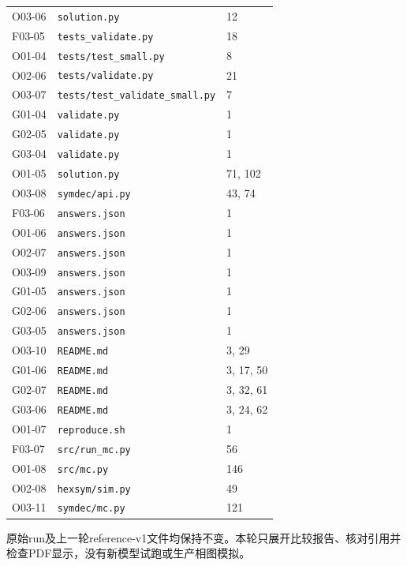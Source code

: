 \documentclass[11pt,a4paper]{article}
\begin{document}
{\begin{longtable}
{}\label{src:O03-06}O03-06 & \nolinkurl{solution.py} & 12\tabularnewline
{}\label{src:F03-05}F03-05 & \nolinkurl{tests_validate.py} & 18\tabularnewline
{}\label{src:O01-04}O01-04 & \nolinkurl{tests/test_small.py} & 8\tabularnewline
{}\label{src:O02-06}O02-06 & \nolinkurl{tests/validate.py} & 21\tabularnewline
{}\label{src:O03-07}O03-07 & \nolinkurl{tests/test_validate_small.py} & 7\tabularnewline
{}\label{src:G01-04}G01-04 & \nolinkurl{validate.py} & 1\tabularnewline
{}\label{src:G02-05}G02-05 & \nolinkurl{validate.py} & 1\tabularnewline
{}\label{src:G03-04}G03-04 & \nolinkurl{validate.py} & 1\tabularnewline
{}\label{src:O01-05}O01-05 & \nolinkurl{solution.py} & 71, 102\tabularnewline
{}\label{src:O03-08}O03-08 & \nolinkurl{symdec/api.py} & 43, 74\tabularnewline
{}\label{src:F03-06}F03-06 & \nolinkurl{answers.json} & 1\tabularnewline
{}\label{src:O01-06}O01-06 & \nolinkurl{answers.json} & 1\tabularnewline
{}\label{src:O02-07}O02-07 & \nolinkurl{answers.json} & 1\tabularnewline
{}\label{src:O03-09}O03-09 & \nolinkurl{answers.json} & 1\tabularnewline
{}\label{src:G01-05}G01-05 & \nolinkurl{answers.json} & 1\tabularnewline
{}\label{src:G02-06}G02-06 & \nolinkurl{answers.json} & 1\tabularnewline
{}\label{src:G03-05}G03-05 & \nolinkurl{answers.json} & 1\tabularnewline
{}\label{src:O03-10}O03-10 & \nolinkurl{README.md} & 3, 29\tabularnewline
{}\label{src:G01-06}G01-06 & \nolinkurl{README.md} & 3, 17, 50\tabularnewline
{}\label{src:G02-07}G02-07 & \nolinkurl{README.md} & 3, 32, 61\tabularnewline
{}\label{src:G03-06}G03-06 & \nolinkurl{README.md} & 3, 24, 62\tabularnewline
{}\label{src:O01-07}O01-07 & \nolinkurl{reproduce.sh} & 1\tabularnewline
{}\label{src:F03-07}F03-07 & \nolinkurl{src/run_mc.py} & 56\tabularnewline
{}\label{src:O01-08}O01-08 & \nolinkurl{src/mc.py} & 146\tabularnewline
{}\label{src:O02-08}O02-08 & \nolinkurl{hexsym/sim.py} & 49\tabularnewline
{}\label{src:O03-11}O03-11 & \nolinkurl{symdec/mc.py} & 121\tabularnewline
\bottomrule
\end{longtable}
}
原始run及上一轮reference-v1文件均保持不变。本轮只展开比较报告、核对引用并检查PDF显示，没有新模型试跑或生产相图模拟。
\end{document}
